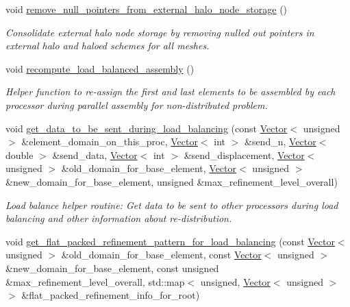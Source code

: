 \begin{DoxyCompactItemize}
void \hyperlink{classoomph_1_1Problem_aee39a957d45bc474c1f5b27d96c9dcc0}{remove\+\_\+null\+\_\+pointers\+\_\+from\+\_\+external\+\_\+halo\+\_\+node\+\_\+storage} ()
\begin{DoxyCompactList}\small\item\em Consolidate external halo node storage by removing nulled out pointers in external halo and haloed schemes for all meshes. \end{DoxyCompactList}\item 
void \hyperlink{classoomph_1_1Problem_aa9d808bb5d62db0da8e962fa29c24af9}{recompute\+\_\+load\+\_\+balanced\+\_\+assembly} ()
\begin{DoxyCompactList}\small\item\em Helper function to re-\/assign the first and last elements to be assembled by each processor during parallel assembly for non-\/distributed problem. \end{DoxyCompactList}\item 
void \hyperlink{classoomph_1_1Problem_ad150d0fa8f2e2ccff79f8ecd78cc1343}{get\+\_\+data\+\_\+to\+\_\+be\+\_\+sent\+\_\+during\+\_\+load\+\_\+balancing} (const \hyperlink{classoomph_1_1Vector}{Vector}$<$ unsigned $>$ \&element\+\_\+domain\+\_\+on\+\_\+this\+\_\+proc, \hyperlink{classoomph_1_1Vector}{Vector}$<$ int $>$ \&send\+\_\+n, \hyperlink{classoomph_1_1Vector}{Vector}$<$ double $>$ \&send\+\_\+data, \hyperlink{classoomph_1_1Vector}{Vector}$<$ int $>$ \&send\+\_\+displacement, \hyperlink{classoomph_1_1Vector}{Vector}$<$ unsigned $>$ \&old\+\_\+domain\+\_\+for\+\_\+base\+\_\+element, \hyperlink{classoomph_1_1Vector}{Vector}$<$ unsigned $>$ \&new\+\_\+domain\+\_\+for\+\_\+base\+\_\+element, unsigned \&max\+\_\+refinement\+\_\+level\+\_\+overall)
\begin{DoxyCompactList}\small\item\em Load balance helper routine\+: Get data to be sent to other processors during load balancing and other information about re-\/distribution. \end{DoxyCompactList}\item 
void \hyperlink{classoomph_1_1Problem_a09788e9f690067496b6621fae12ba354}{get\+\_\+flat\+\_\+packed\+\_\+refinement\+\_\+pattern\+\_\+for\+\_\+load\+\_\+balancing} (const \hyperlink{classoomph_1_1Vector}{Vector}$<$ unsigned $>$ \&old\+\_\+domain\+\_\+for\+\_\+base\+\_\+element, const \hyperlink{classoomph_1_1Vector}{Vector}$<$ unsigned $>$ \&new\+\_\+domain\+\_\+for\+\_\+base\+\_\+element, const unsigned \&max\+\_\+refinement\+\_\+level\+\_\+overall, std\+::map$<$ unsigned, \hyperlink{classoomph_1_1Vector}{Vector}$<$ unsigned $>$ $>$ \&flat\+\_\+packed\+\_\+refinement\+\_\+info\+\_\+for\+\_\+root)

\end{DoxyCompactItemize}

